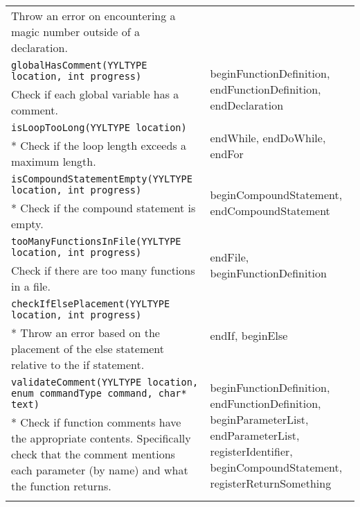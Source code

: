 \documentclass[12pt]{report}
\begin{document}
\begin{longtable}{p{10cm} p{\saxColSize}}
			 Throw an error on encountering a magic number outside of a declaration. \vspace{\vertSize} \\
		\lstinline!globalHasComment(YYLTYPE location, int progress)! & \multirow{2}{\saxColSize}{beginFunctionDefinition, endFunctionDefinition, endDeclaration} \\*
			 Check if each global variable has a comment. \vspace{\vertSize} \\
		\lstinline!isLoopTooLong(YYLTYPE location)! & \multirow{2}{\saxColSize}{endWhile, endDoWhile, endFor} \\ *
			Check if the loop length exceeds a maximum length. \vspace{\vertSize} \\
		\lstinline!isCompoundStatementEmpty(YYLTYPE location, int progress)!  & \multirow{2}{\saxColSize}{beginCompoundStatement, endCompoundStatement} \\ *
			Check if the compound statement is empty. \vspace{\vertSize} \\
		\lstinline!tooManyFunctionsInFile(YYLTYPE location, int progress)! & \multirow{2}{\saxColSize}{endFile, beginFunctionDefinition} \\*
			 Check if there are too many functions in a file. \vspace{\vertSize} \\
		\lstinline!checkIfElsePlacement(YYLTYPE location, int progress)! & \multirow{2}{\saxColSize}{endIf, beginElse} \\ *
			Throw an error based on the placement of the else statement relative to the if statement.  \vspace{\vertSize} \\
		\lstinline!validateComment(YYLTYPE location, enum commandType command, char* text)! & \multirow{2}{\saxColSize}{beginFunctionDefinition, endFunctionDefinition, beginParameterList, endParameterList, registerIdentifier, beginCompoundStatement, registerReturnSomething} \\ *
			Check if function comments have the appropriate contents. Specifically check that the comment mentions each parameter (by name) and what the function returns. \vspace{\vertSize} \\

\vspace{1mm}
\end{longtable}
\end{document}
